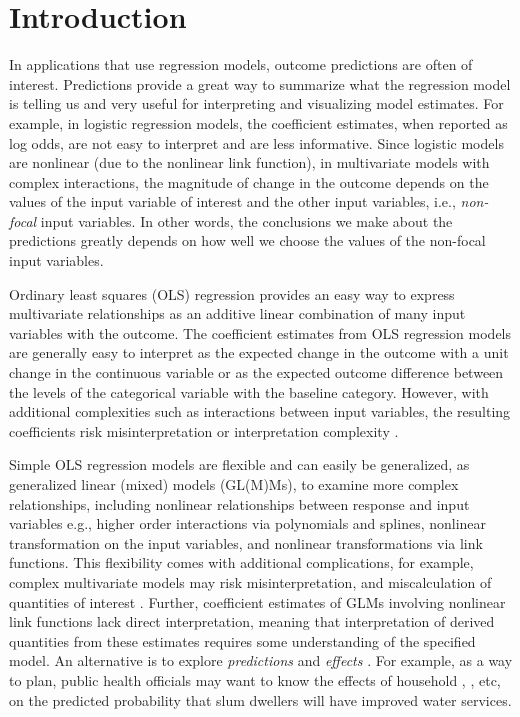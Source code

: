 
\linenumbers

\section{Introduction}


In applications that use regression models, outcome predictions are often of interest. Predictions provide a great way to summarize what the regression model is telling us and very useful for interpreting and visualizing model estimates. For example, in logistic regression models, the coefficient estimates, when reported as log odds, are not easy to interpret and are less informative. Since logistic models are nonlinear (due to the nonlinear link function), in multivariate models with complex interactions, the magnitude of change in the outcome depends on the values of the input variable of interest and the other input variables, i.e., \emph{non-focal} input variables. In other words, the conclusions we make about the predictions greatly depends on how well we choose the values of the non-focal input variables.  

Ordinary least squares (OLS) regression provides an easy way to express multivariate relationships as an additive linear combination of many input variables with the outcome. The coefficient estimates from OLS regression models are generally easy to interpret as the expected change in the outcome with a unit change in the continuous variable or as the expected outcome difference between the levels of the categorical variable with the baseline category. However, with additional complexities such as interactions between input variables, the resulting coefficients risk misinterpretation or interpretation complexity \citep{brambor_understanding_2006, berry_improving_2012}. 

Simple OLS regression models are flexible and can easily be generalized, as generalized linear (mixed) models (GL(M)Ms), to examine more complex relationships, including nonlinear relationships between response and input variables e.g., higher order interactions via polynomials and splines, nonlinear transformation on the input variables, and nonlinear transformations via link functions. This flexibility comes with additional complications, for example, complex multivariate models may risk misinterpretation, and miscalculation of quantities of interest \citep{berry_improving_2012, leeper2017interpreting}. Further, coefficient estimates of GLMs involving nonlinear link functions lack direct interpretation\citep{leeper2017interpreting}, meaning that interpretation of derived quantities from these estimates requires some understanding of the specified model. An alternative is to explore \emph{predictions} and \emph{effects} \citep{fox2009effect, leeper2017package, lenth2018package}.  For example, as a way to plan, public health officials may want to know the effects of household , , etc, on the predicted probability that slum dwellers will have improved water services. 

